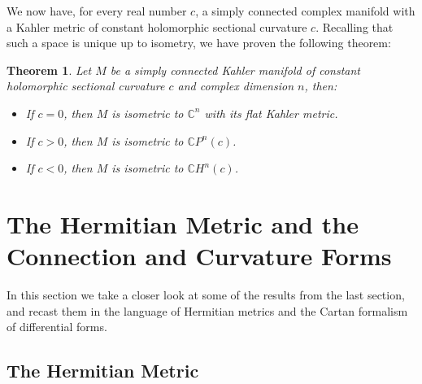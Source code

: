\documentclass[11pt]{amsart}
\newtheorem{thm}[subsection]{Theorem}
\theoremstyle{definition}
\def \CP{ \mathbb{C}P }
\def \C{ \mathbb{C} }
\def \CH{ \mathbb{C}H }
\begin{document}
We now have, for every real number $c$, a simply connected complex manifold with a Kahler metric of constant holomorphic sectional curvature $c$.  Recalling that such a space is unique up to isometry, we have proven the following theorem:

\begin{thm} Let $M$ be a simply connected Kahler manifold of constant holomorphic sectional curvature $c$ and complex dimension $n$, then:
%
\begin{itemize}
%
\item If $c = 0$, then $M$ is isometric to $\C^n$ with its flat Kahler metric.
\item If $c > 0$, then $M$ is isometric to $\CP^n (c)$.
\item If $c < 0$, then $M$ is isometric to $\CH^n (c)$.
%
\end{itemize}
%
\end{thm}

\section{ The Hermitian Metric and the Connection and Curvature Forms }

In this section we take a closer look at some of the results from the last section, and recast them in the language of Hermitian metrics and the Cartan formalism of differential forms.

\subsection{ The Hermitian Metric }
\end{document}
